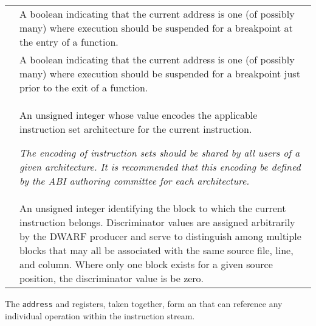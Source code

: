 \begin{longtable}{l|P{9cm}}
 &
A boolean indicating that the current address is one (of possibly many)
where execution should be suspended for a breakpoint at the entry of a
function. \\

 &
A boolean indicating that the current address is one (of possibly many)
where execution should be suspended for a breakpoint just prior to
the exit of a function. \\

 &
An unsigned integer whose value encodes the applicable
instruction set architecture for the current instruction.

\textit{The encoding of instruction sets should be shared by all
users of a given architecture. It is recommended that this
encoding be defined by the ABI authoring committee for each
architecture.} \\

 &
An unsigned integer identifying the block to which the
current instruction belongs. Discriminator values are assigned
arbitrarily by the DWARF producer and serve to distinguish
among multiple blocks that may all be associated with the
same source file, line, and column. Where only one block
exists for a given source position, the discriminator value
is be zero. \\
\end{longtable}

The \texttt{address} and  registers,
taken together, form an  that can 
reference any individual operation within the instruction stream.

